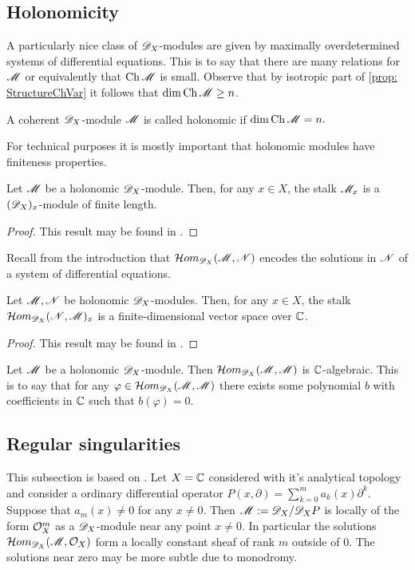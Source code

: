 \subsection{Holonomicity}
A particularly nice class of $\mathscr{D}_X$-modules are given by maximally overdetermined systems of differential equations.
This is to say that there are many relations for $\mathscr{M}$ or equivalently that $\operatorname{Ch}\mathscr{M}$ is small.
Observe that by isotropic part of \cref{prop: StructureChVar} it follows that $\dim \operatorname{Ch}\mathscr{M} \geq n$.
\begin{definition}
  A coherent $\mathscr{D}_X$-module $\mathscr{M}$ is called holonomic if
  $\dim \operatorname{Ch} \mathscr{M}  = n.$
\end{definition}
For technical purposes it is mostly important that holonomic modules have finiteness properties.
\begin{proposition}
  Let $\mathscr{M}$ be a holonomic $\mathscr{D}_X$-module. Then, for any $x\in X$, the stalk $\mathscr{M}_x$ is a $(\mathscr{D}_X)_x$-module of finite length.
\end{proposition}
\begin{proof}
  This result may be found in \cite[Chapter 4]{kashiwara2003d}.
\end{proof}
Recall from the introduction that $\mathcal{H}om_{\mathscr{D}_X}(\mathscr{M},\mathscr{N})$ encodes the solutions in $\mathscr{N}$ of a system of differential equations.
\begin{proposition}
  Let $\mathscr{M},\mathscr{N}$ be holonomic $\mathscr{D}_X$-modules. Then, for any $x\in X$, the stalk $\mathcal{H}om_{\mathscr{D}_X}(\mathscr{N},\mathscr{M})_x$ is a finite-dimensional vector space over $\mathbb{C}$.
\end{proposition}
\begin{proof}
  This result may be found in \cite[Chapter 4]{kashiwara2003d}.
\end{proof}
\begin{corollary}
  Let $\mathscr{M}$ be a holonomic $\mathscr{D}_X$-module. Then $\mathcal{H}om_{\mathscr{D}_X}(\mathscr{M},\mathscr{M})$ is $\mathbb{C}$-algebraic. This is to say that for any $\varphi \in\mathcal{H}om_{\mathscr{D}_X}(\mathscr{M},\mathscr{M}) $ there exists some polynomial $b$ with coefficients in $\mathbb{C}$ such that $b(\varphi)=0$.
\end{corollary}
\subsection{Regular singularities}
This subsection is based on \cite[Chapter 5]{kashiwara2003d}.
Let $X=\mathbb{C}$ considered with it's analytical topology and consider a ordinary differential operator
$P(x,\partial) = \sum_{k=0}^m a_k(x)\partial^k.$
Suppose that $a_m(x)\neq 0$ for any $x\neq 0$.
Then $\mathscr{M} :=\mathscr{D}_X/\mathscr{D}_X P$ is locally of the form $\mathcal{O}_X^m$ as a $\mathscr{D}_X$-module near any point $x\neq 0$.
In particular the solutions $\mathcal{H}om_{\mathscr{D}_X}(\mathscr{M},\mathcal{O}_X)$ form a locally constant sheaf of rank $m$ outside of $0$.
The solutions near zero may be more subtle due to monodromy.

